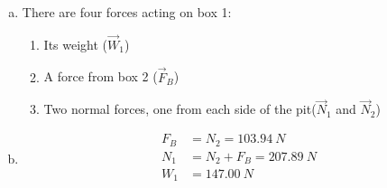 \begin{finalanswer}
\begin{enumerate}[(a)]
\item There are four forces acting on box 1:
\begin{enumerate}
\item Its weight ($\vec W_1$)
\item A force from box 2 ($\vec F_B$)
\item Two normal forces, one from each side of the pit($\vec N_1$ and $\vec N_2$)
\end{enumerate}
\item \begin{align*}
F_B&=N_2=\SI{103.94}{N}\\
N_1&=N_2+F_B=\SI{207.89}{N}\\
W_1&=\SI{147.00}{N}\\
\end{align*}
\end{enumerate}
\end{finalanswer}
